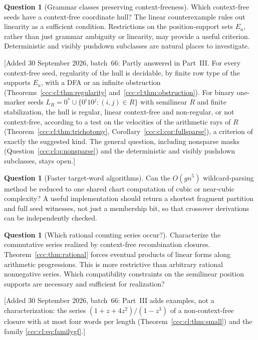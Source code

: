 \documentclass[11pt,letterpaper]{article}
\theoremstyle{definition}
\newtheorem{question}[theorem]{Question}
\theoremstyle{remark}
\newcommand{\wadd}[1]{\textup{[}Added 30 September 2026, batch~66: #1\textup{]}}
\begin{document}
\begin{question}[Grammar classes preserving context-freeness]\label{ccc:q:grammar}
Which context-free seeds have a context-free coordinate hull? The linear
counterexample rules out linearity as a sufficient condition. Restrictions
on the position-support sets $E_a$, rather than just grammar ambiguity or
linearity, may provide a useful criterion. Deterministic and visibly
pushdown subclasses are natural places to investigate.
\end{question}
\wadd{Partly answered in Part~III. For every context-free seed, regularity of
the hull is decidable, by finite row type of the supports $E_a$, with a DFA
or an infinite obstruction (Theorems~\ref{ccc:cl:thm:regularity}
and~\ref{ccc:cl:thm:obstruction}). For binary one-marker seeds
$L_R=0^*\cup\{0^i10^j:(i,j)\in R\}$ with semilinear $R$ and finite
stabilization, the hull is regular, linear context-free and non-regular, or
not context-free, according to a test on the velocities of the arithmetic
rays of $R$ (Theorem~\ref{ccc:cl:thm:trichotomy},
Corollary~\ref{ccc:cl:cor:fullsparse}), a criterion of exactly the suggested
kind. The general question, including nonsparse masks
(Question~\ref{ccc:cl:q:nonsparse}) and the deterministic and visibly
pushdown subclasses, stays open.}

\begin{question}[Faster target-word algorithms]
Can the $O(gn^5)$ wildcard-parsing method be reduced to one shared chart
computation of cubic or near-cubic complexity? A useful implementation should
return a shortest fragment partition and full seed witnesses, not just a
membership bit, so that crossover derivations can be independently checked.
\end{question}

\begin{question}[Which rational counting series occur?]\label{ccc:q:series}
Characterize the commutative series realized by context-free recombination
closures. Theorem~\ref{ccc:thm:rational} forces eventual products of linear forms
along arithmetic progressions. This is more restrictive than arbitrary
rational nonnegative series. Which compatibility constraints on the
semilinear position supports are necessary and sufficient for realization?
\end{question}
\wadd{Part~III adds examples, not a characterization: the series
$(1+z+4z^2)/(1-z^3)$ of a non-context-free closure with at most four words per
length (Theorem~\ref{ccc:cl:thm:small}) and the family
\eqref{ccc:cl:eq:familygf}.}
\end{document}
